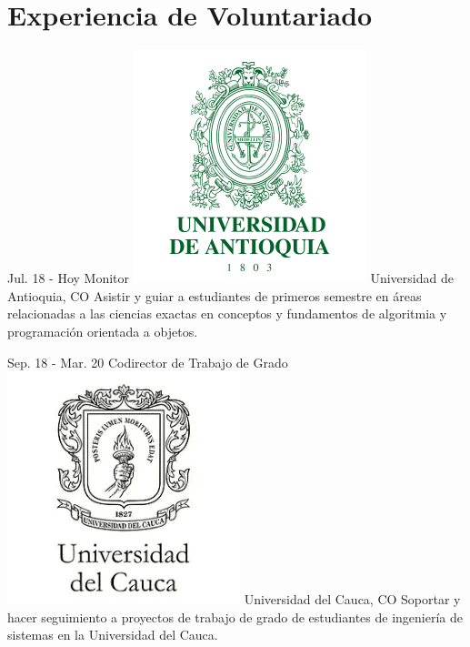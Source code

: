 \documentclass[]{cv-class}
\begin{document}
\newpage

\section{Experiencia de Voluntariado}
\begin{entrylist}
	  
	\entry
	{Jul. 18 - Hoy}
	{Monitor}
	{{\includegraphics[scale=0.05]{img/udea-logo.png}} Universidad de Antioquia, CO} 
	{Asistir y guiar a estudiantes de primeros semestre en áreas relacionadas a las ciencias exactas en conceptos y fundamentos de algoritmia y programación orientada a objetos.}
	  
	\entry
	{Sep. 18 - Mar. 20}
	{Codirector de Trabajo de Grado}
	{{\includegraphics[scale=0.05]{img/unicauca-logo.png}} Universidad del Cauca, CO} 
	{Soportar y hacer seguimiento a proyectos de trabajo de grado de estudiantes de ingeniería de sistemas en la Universidad del Cauca.}
	

\end{entrylist}
\end{document}
